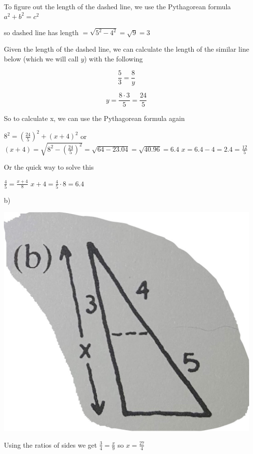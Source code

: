 \documentclass[]{report}
\begin{document}
To figure out the length of the dashed line, we use the Pythagorean formula $a^2 + b^2 = c^2$

so dashed line has length $ = \sqrt{5^2 - 4^2} = \sqrt{9} = 3$

Given the length of the dashed line, we can calculate the length of the similar line below (which we will call $y$) with the following

\[
\frac{5}{3} = \frac{8}{y}
\]

\[
y = \frac{8\cdot3}{5} = \frac{24}{5}
\]

So to calculate x, we can use the Pythagorean formula again

$8^2 = (\frac{24}{5})^2  + (x + 4)^2$
or 
$(x+4) =\sqrt{8^2  - (\frac{24}{5})^2} = \sqrt{64 - 23.04} = \sqrt{40.96} = 6.4$
$x  = 6.4  - 4  = 2.4 = \frac{12}{5}$

Or the quick way to solve this

$\frac{4}{5} =\frac{x+4}{8}$
$x+4 = \frac{4}{5} \cdot 8 = 6.4$

b)

\includegraphics[width=\textwidth]{precalc-geo-section1-question-11b.jpg}

Using the ratios of sides we get
$\frac{3}{4} =  \frac{x}{9}$
so $x = \frac{27}{4} $
\end{document}
